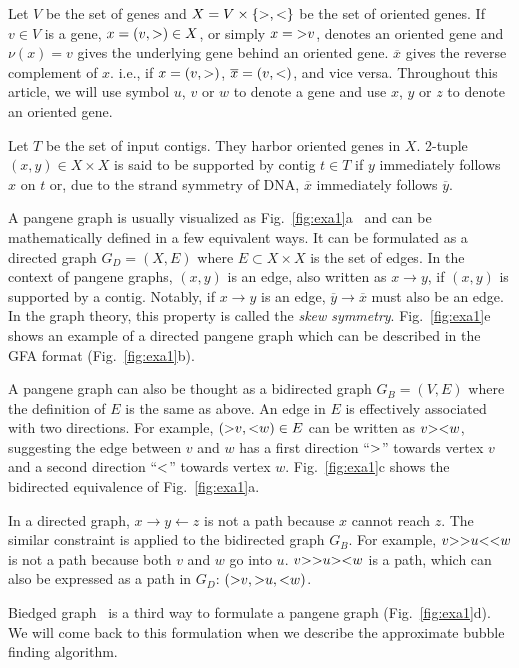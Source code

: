 \documentclass[webpdf,contemporary,large,namedate]{oup-authoring-template}%
\begin{document}
Let $V$ be the set of genes
and $X=V\times\{{\rm >},{\rm <}\}$ be the set of oriented genes.
If $v\in V$ is a gene, $x=(v,{\rm >})\in X$, or simply $x={\rm >}v$, denotes an oriented gene
and $\nu(x)=v$ gives the underlying gene behind an oriented gene.
$\overline{x}$ gives the reverse complement of $x$.
i.e., if $x=(v,{\rm >})$, $\overline{x}=(v,{\rm <})$, and vice versa.
Throughout this article, we will use symbol $u$, $v$ or $w$ to denote a gene
and use $x$, $y$ or $z$ to denote an oriented gene.

Let $T$ be the set of input contigs.
They harbor oriented genes in $X$.
2-tuple $(x,y)\in X\times X$ is said to be supported by contig $t\in T$
if $y$ immediately follows $x$ on $t$ or, due to the strand symmetry of DNA, $\overline{x}$ immediately follows $\overline{y}$.

A pangene graph is usually visualized as Fig.~\ref{fig:exa1}a~\citep{Wick:2015qf}
and can be mathematically defined in a few equivalent ways.
It can be formulated as a directed graph $G_D=(X,E)$ where $E\subset X\times X$ is the set of edges.
In the context of pangene graphs, $(x,y)$ is an edge, also written as $x\to y$, if $(x,y)$ is supported by a contig.
Notably, if $x\to y$ is an edge, $\overline{y}\to\overline{x}$ must also be an edge.
In the graph theory, this property is called the \emph{skew symmetry}.
Fig.~\ref{fig:exa1}e shows an example of a directed pangene graph
which can be described in the GFA format (Fig.~\ref{fig:exa1}b).

A pangene graph can also be thought as a bidirected graph $G_B=(V,E)$ where the definition of $E$ is the same as above.
An edge in $E$ is effectively associated with two directions.
For example, $({\rm >}v,{\rm <}w)\in E$ can be written as $v{\rm ><}w$,
suggesting the edge between $v$ and $w$ has a first direction ``${\rm >}$'' towards vertex $v$ and a second direction ``${\rm <}$'' towards vertex $w$.
Fig.~\ref{fig:exa1}c shows the bidirected equivalence of Fig.~\ref{fig:exa1}a.

In a directed graph, $x\to y\gets z$ is not a path because $x$ cannot reach $z$.
The similar constraint is applied to the bidirected graph $G_B$.
For example, $v{\rm >>}u{\rm <<}w$ is not a path because both $v$ and $w$ go into $u$.
$v{\rm >>}u{\rm ><}w$ is a path, which can also be expressed as a path in $G_D$: $({\rm >}v,{\rm >}u,{\rm <}w)$.

Biedged graph~\citep{Paten:2018aa} is a third way to formulate a pangene graph (Fig.~\ref{fig:exa1}d).
We will come back to this formulation when we describe the approximate bubble finding algorithm.
\end{document}
